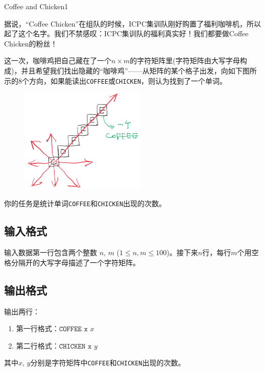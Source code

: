 \begin{Problem}{Coffee and Chicken}{1}

据说，“Coffee Chicken”在组队的时候，ICPC集训队刚好购置了福利咖啡机，所以起了这个名字。我们不禁感叹：ICPC集训队的福利真实好！我们都要做Coffee Chicken的粉丝！

这一次，咖啡鸡把自己藏在了一个$n\times m$的字符矩阵里(字符矩阵由大写字母构成)，并且希望我们找出隐藏的“咖啡鸡”——从矩阵的某个格子出发，向如下图所示的8个方向，如果能读出\texttt{COFFEE}或\texttt{CHICKEN}，则认为找到了一个单词。

\begin{figure}[h]
  \center
  \includegraphics[width=6cm]{src/cac/coffeechicken.png}
\end{figure}

你的任务是统计单词\texttt{COFFEE}和\texttt{CHICKEN}出现的次数。

\subsection*{输入格式}

输入数据第一行包含两个整数 $n$, $m$ ($1\le n,m\le 100$)。接下来$n$行，每行$m$个用空格分隔开的大写字母描述了一个字符矩阵。

\subsection*{输出格式}

输出两行：

\begin{enumerate}
\item 第一行格式：$\texttt{COFFEE x $x$}$
\item 第二行格式：$\texttt{CHICKEN x $y$}$
\end{enumerate}

其中$x$, $y$分别是字符矩阵中\texttt{COFFEE}和\texttt{CHICKEN}出现的次数。


\end{Problem}
